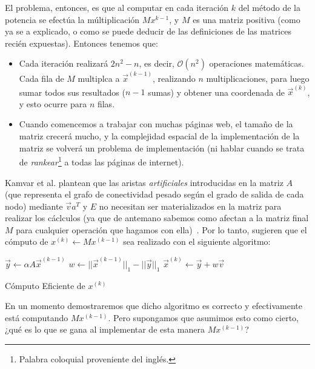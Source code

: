 \par El problema, entonces, es que al computar en cada iteraci\'on $k$ del
m\'etodo de la potencia se efect\'ua la m\'ultiplicaci\'on $Mx^{k-1}$, y $M$ es
una matriz positiva (como ya se a explicado, o como se puede deducir de las
definiciones de las matrices reci\'en expuestas). Entonces tenemos que:

\begin{itemize}
    \item Cada iteraci\'on realizar\'a $2n^2-n$, es decir, $\mathcal{O}(n^2)$
        operaciones matem\'aticas. Cada fila de $M$ multiplca a
        $\vec{x}^{(k-1)}$, realizando $n$ multiplicaciones, para luego sumar
        todos sus resultados ($n-1$ sumas) y obtener una coordenada de
        $\vec{x}^{(k)}$, y esto ocurre para $n$ filas.

    \item Cuando comencemos a trabajar con muchas p\'aginas web, el tama\~no de
        la matriz crecer\'a mucho, y la complejidad espacial de la
        implementaci\'on de la matriz se volver\'a un problema de
        implementaci\'on (ni hablar cuando se trata de
        \emph{rankear}\footnote{Palabra coloquial proveniente del ingl\'es.} a
        todas las p\'aginas de internet).
\end{itemize}
\medskip

\par Kamvar et al. plantean que las aristas \emph{artificiales} introducidas en
la matriz $A$ (que representa el grafo de conectividad pesado seg\'un el grado
de salida de cada nodo) mediante $\vec{v}a^T$ y $E$ no necesitan ser
materializados en la matriz para realizar los c\'aclculos (ya que de antemano
sabemos como afectan a la matriz final $M$ para cualquier operaci\'on que
hagamos con ella)~\cite[p.262]{Kamvar2003}. Por lo tanto, sugieren que el
c\'omputo de $x^{(k)} \gets Mx^{(k-1)}$ sea realizado con el siguiente
algoritmo:

\begin{algorithm}
    $\vec{y} \gets \alpha A \vec{x}^{(k-1)}$\;
    $w \gets ||\vec{x}^{(k-1)}||_1 - ||\vec{y}||_1$\;
    $\vec{x}^{(k)}\gets \vec{y}+w\vec{v}$\;
    \caption{C\'omputo Eficiente de $x^{(k)}$\cite[p.262]{Kamvar2003}}
    \label{alg:power_method3}
\end{algorithm}

\par En un momento demostraremos que dicho algoritmo es correcto y efectivamente
est\'a computando $Mx^{(k-1)}$. Pero supongamos que asumimos esto como cierto,
¿qu\'e es lo que se gana al implementar de esta manera $Mx^{(k-1)}$?

